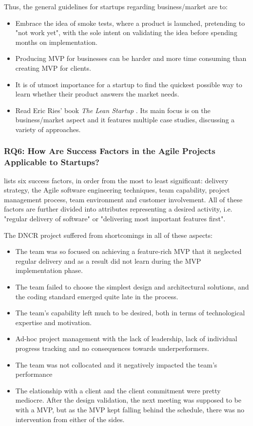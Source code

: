\documentclass{article}
\begin{document}
Thus, the general guidelines for startups regarding business/market are to:
\begin{itemize}
\item Embrace the idea of smoke tests, where a product is launched, pretending to "not work yet", with the sole intent on validating the idea before spending months on implementation.
\item Producing MVP for businesses can be harder and more time consuming than creating MVP for clients.
\item It is of utmost importance for a startup to find the quickest possible way to learn whether their product answers the market needs.
\item Read Eric Ries' book \textit{The Lean Startup} \citep{ries2011lean}. Its main focus is on the business/market aspect and it features multiple case studies, discussing a variety of approaches.
\end{itemize}

\subsubsection{RQ6: How Are Success Factors in the Agile Projects \citep{cao2008agile} Applicable to Startups?}
\citeauthor{cao2008agile} lists six success factors, in order from the most to least significant: delivery strategy, the Agile software engineering techniques, team capability, project management process, team environment and customer involvement. All of these factors are further divided into attributes representing a desired activity, i.e. "regular delivery of software" or "delivering most important features first".

The DNCR project suffered from shortcomings in all of these aspects:
\begin{itemize}
\item The team was so focused on achieving a feature-rich MVP that it neglected regular delivery and as a result did not learn during the MVP implementation phase.
\item The team failed to choose the simplest design and architectural solutions, and the coding standard emerged quite late in the process.
\item The team's capability left much to be desired, both in terms of technological expertise and motivation.
\item Ad-hoc project management with the lack of leadership, lack of individual progress tracking and no consequences towards underperformers.
\item The team was not collocated and it negatively impacted the team's performance
\item The elationship with a client and the client commitment were pretty mediocre. After the design validation, the next meeting was supposed to be with a MVP, but as the MVP kept falling behind the schedule, there was no intervention from either of the sides.
\end{itemize}
\end{document}
